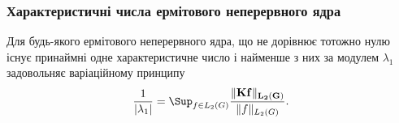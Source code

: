 
\subsubsection{Характеристичні числа ермітового неперервного ядра}

\begin{theorem}
	Для будь-якого ермітового неперервного ядра, що не дорівнює тотожно нулю існує принаймні одне характеристичне число і найменше з них за модулем $\lambda_1$ задовольняє варіаційному принципу
	\begin{equation}
		\label{eq:3.2}
		\dfrac{1}{|\lambda_1|} = \Sup_{f \in L_2(G)} \dfrac{\|\bf{K} f\|_{L_2(G)}}{\|f\|_{L_2(G)}}.
	\end{equation}
\end{theorem}

